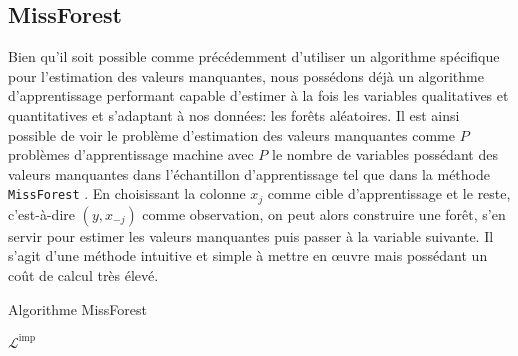 \subsection{MissForest}

Bien qu'il soit possible comme précédemment d'utiliser un algorithme spécifique pour l'estimation des valeurs manquantes, nous possédons déjà un algorithme d'apprentissage performant capable d'estimer à la fois les variables qualitatives et quantitatives et s'adaptant à nos données: les forêts aléatoires. Il est ainsi possible de voir le problème d'estimation des valeurs manquantes comme $P$ problèmes d'apprentissage machine avec $P$ le nombre de variables possédant des valeurs manquantes dans l'échantillon d'apprentissage tel que dans la méthode \texttt{MissForest} \citep{Stekhoven2012}. En choisissant la colonne $x_j$ comme cible d'apprentissage et le reste, c'est-à-dire $(y,x_{-j})$ comme observation, on peut alors construire une forêt, s'en servir pour estimer les valeurs manquantes puis passer à la variable suivante. Il s'agit d'une méthode intuitive et simple à mettre en œuvre mais possédant un coût de calcul très élevé.

\begin{algorithm}
\caption{Algorithme MissForest}
\begin{algorithmic}
        \EndFor
    \EndWhile
    \State \Return $\mathcal{L}^\text{imp}$
    \EndProcedure
\end{algorithmic}    
\end{algorithm}

